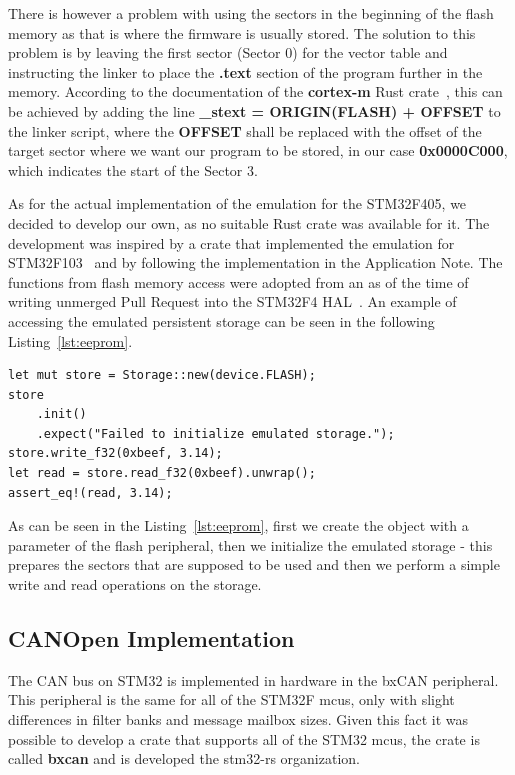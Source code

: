 There is however a problem with using the sectors in the beginning of the flash memory as that is where the firmware is usually stored.
The solution to this problem is by leaving the first sector (Sector 0) for the vector table and instructing the linker to place the \textbf{.text} section of the program further in the memory.
According to the documentation of the \textbf{cortex-m} Rust crate~\cite{rust_embedded_devices_wg_rust-embeddedcortex-m_2021}, this can be achieved by adding the line \textbf{\_stext = ORIGIN(FLASH) + OFFSET} to the linker script, where the \textbf{OFFSET} shall be replaced with the offset of the target sector where we want our program to be stored, in our case \textbf{0x0000C000}, which indicates the start of the Sector 3.

As for the actual implementation of the emulation for the STM32F405, we decided to develop our own, as no suitable Rust crate was available for it.
The development was inspired by a crate that implemented the emulation for STM32F103~\cite{dubrov_idubroveeprom_2020} and by following the implementation in the Application Note.
The functions from flash memory access were adopted from an as of the time of writing unmerged Pull Request into the STM32F4 HAL~\cite{astro_implement_2020}.
An example of accessing the emulated persistent storage can be seen in the following Listing~\ref{lst:eeprom}.

\begin{lstlisting}[caption={An example use of the emulated persistent storage.},label=lst:eeprom]
let mut store = Storage::new(device.FLASH);
store
    .init()
    .expect("Failed to initialize emulated storage.");
store.write_f32(0xbeef, 3.14);
let read = store.read_f32(0xbeef).unwrap();
assert_eq!(read, 3.14);
\end{lstlisting}

As can be seen in the Listing~\ref{lst:eeprom}, first we create the object with a parameter of the flash peripheral, then we initialize the emulated storage - this prepares the sectors that are supposed to be used and then we perform a simple write and read operations on the storage.

\subsection{CANOpen Implementation}
\label{subsec:canopen_impl}
The CAN bus on STM32 is implemented in hardware in the bxCAN peripheral.
This peripheral is the same for all of the STM32F \acs{mcu}s, only with slight differences in filter banks and message mailbox sizes.
Given this fact it was possible to develop a crate that supports all of the STM32 \acs{mcu}s, the crate is called \textbf{bxcan} and is developed the stm32-rs organization.

